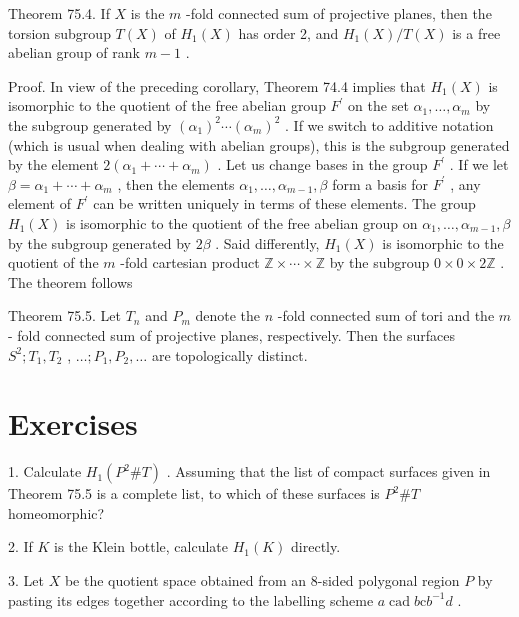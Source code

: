 Theorem 75.4. If \(X\) is the \(m\) -fold connected sum of projective planes, then the torsion subgroup \(T\left( X\right)\) of \({H}_{1}\left( X\right)\) has order 2, and \({H}_{1}\left( X\right) /T\left( X\right)\) is a free abelian group of rank \(m - 1\) .

Proof. In view of the preceding corollary, Theorem 74.4 implies that \({H}_{1}\left( X\right)\) is isomorphic to the quotient of the free abelian group \({F}^{\prime }\) on the set \({\alpha }_{1},\ldots ,{\alpha }_{m}\) by the subgroup generated by \({\left( {\alpha }_{1}\right) }^{2}\cdots {\left( {\alpha }_{m}\right) }^{2}\) . If we switch to additive notation (which is usual when dealing with abelian groups), this is the subgroup generated by the element \(2\left( {{\alpha }_{1} + \cdots  + {\alpha }_{m}}\right)\) . Let us change bases in the group \({F}^{\prime }\) . If we let \(\beta  = {\alpha }_{1} + \cdots  + {\alpha }_{m}\) , then the elements \({\alpha }_{1},\ldots ,{\alpha }_{m - 1},\beta\) form a basis for \({F}^{\prime }\) , any element of \({F}^{\prime }\) can be written uniquely in terms of these elements. The group \({H}_{1}\left( X\right)\) is isomorphic to the quotient of the free abelian group on \({\alpha }_{1},\ldots ,{\alpha }_{m - 1},\beta\) by the subgroup generated by \({2\beta }\) . Said differently, \({H}_{1}\left( X\right)\) is isomorphic to the quotient of the \(m\) -fold cartesian product \(\mathbb{Z} \times  \cdots  \times  \mathbb{Z}\) by the subgroup \(0 \times  0 \times  2\mathbb{Z}\) . The theorem follows

Theorem 75.5. Let \({T}_{n}\) and \({P}_{m}\) denote the \(n\) -fold connected sum of tori and the \(m\) - fold connected sum of projective planes, respectively. Then the surfaces \({S}^{2};{T}_{1},{T}_{2}\) , \(\ldots ;{P}_{1},{P}_{2},\ldots\) are topologically distinct.

\section*{Exercises}

1. Calculate \({H}_{1}\left( {{P}^{2}\# T}\right)\) . Assuming that the list of compact surfaces given in Theorem 75.5 is a complete list, to which of these surfaces is \({P}^{2}\# T\) homeomorphic?

2. If \(K\) is the Klein bottle, calculate \({H}_{1}\left( K\right)\) directly.

3. Let \(X\) be the quotient space obtained from an 8-sided polygonal region \(P\) by pasting its edges together according to the labelling scheme \(a\operatorname{cad}b\mathrm{c}{b}^{-1}d\) .

